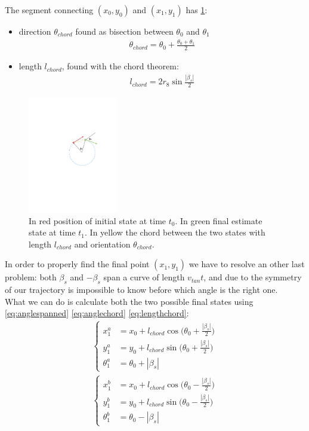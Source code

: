\begin{itemize}
The segment connecting $(x_0,y_0)$ and $(x_1,y_1)$ has \ref{fig:chord}:
\begin{itemize}
\item direction $\theta_{chord}$ found as bisection between 
 $\theta_0$ and $\theta_1$
 \begin{align}
 \theta_{chord} = \theta_0 + \frac{\theta_0 + \theta_1}{2} 
 \label{eq:anglechord}
 \end{align}
\item length $l_{chord}$, found with the chord theorem: %
\begin{align}
 l_{chord} = 2r_8\sin{\frac{|\beta_s|}{2}}
  \label{eq:lengthchord}
 \end{align}
\end{itemize}
\begin{figure}[!htbp]
    \centering
    \includegraphics[width=0.35\textwidth]{img/chord.pdf}
    \caption{In red position of initial state at time $t_0$. In green final estimate state at time $t_1$. In yellow the chord between the two states with length $l_{chord}$ and orientation $\theta_{chord}$.}
    \label{fig:chord}
\end{figure}

In order to properly find the final point $(x_1,y_1)$ we have to resolve an other last problem: both $\beta_{s}$ and  $-\beta_{s}$ span a curve of length $v_{tan}t$, and due to the symmetry of our trajectory is impossible to know before which angle is the right one. \\
What we can do is calculate both the two possible final states using \ref{eq:anglespanned} \ref{eq:anglechord} \ref{eq:lengthchord}:
\begin{align}
\begin{cases}
x_1^a &= x_0 + l_{chord}\cos{\Big(\theta_0 + \frac{|\beta_s|}{2}\Big) }\\
y_1^a &= y_0 + l_{chord}\sin{\Big(\theta_0 + \frac{|\beta_s|}{2} \Big)}\\
\theta_1^a &=  \theta_0 + |\beta_s|
\label{eq:finalstatecurvea}
\end{cases}
\end{align}
\begin{align}
\begin{cases}
x_1^b &= x_0 + l_{chord}\cos{\Big(\theta_0 - \frac{|\beta_s|}{2}\Big) }\\
y_1^b &= y_0 + l_{chord}\sin{\Big(\theta_0 - \frac{|\beta_s|}{2}\Big) }\\
\theta_1^b &=  \theta_0 - |\beta_s|
\label{eq:finalstatecurveb}
\end{cases}
\end{align}


\end{itemize}
